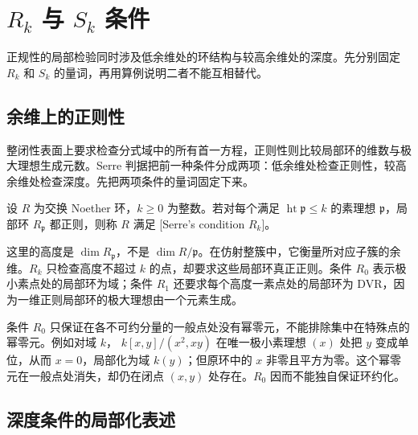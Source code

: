 
\section{\texorpdfstring{\(R_k\)}{Rₖ} 与 \texorpdfstring{\(S_k\)}{Sₖ} 条件}
\label{b3:sec:2001}

正规性的局部检验同时涉及低余维处的环结构与较高余维处的深度。先分别固定 \(R_k\) 和 \(S_k\) 的量词，再用算例说明二者不能互相替代。


%
%

\subsection{余维上的正则性}
\label{b3:subsec:2001:01}

整闭性表面上要求检查分式域中的所有首一方程，正则性则比较局部环的维数与极大理想生成元数。Serre 判据把前一种条件分成两项：低余维处检查正则性，较高余维处检查深度。先把两项条件的量词固定下来。

\begin{definition}\label{b3:def:serre-rk}
	设 \(R\) 为交换 Noether 环，\(k\ge0\) 为整数。若对每个满足 \(\operatorname{ht}\mathfrak p\le k\) 的素理想 \(\mathfrak p\)，局部环 \(R_{\mathfrak p}\) 都正则，则称 \(R\) 满足 [Serre's condition \(R_k\)]。
\end{definition}

这里的高度是 \(\dim R_{\mathfrak p}\)，不是 \(\dim R/\mathfrak p\)。在仿射整簇中，它衡量所对应子簇的余维。\(R_k\) 只检查高度不超过 \(k\) 的点，却要求这些局部环真正正则。条件 \(R_0\) 表示极小素点处的局部环为域；条件 \(R_1\) 还要求每个高度一素点处的局部环为 DVR，因为一维正则局部环的极大理想由一个元素生成。

\ProseParagraphBreak
条件 \(R_0\) 只保证在各不可约分量的一般点处没有幂零元，不能排除集中在特殊点的幂零元。例如对域 \(k\)， \(k[x,y]/(x^2,xy)\) 在唯一极小素理想 \((x)\) 处把 \(y\) 变成单位，从而 \(x=0\)，局部化为域 \(k(y)\)；但原环中的 \(x\) 非零且平方为零。这个幂零元在一般点处消失，却仍在闭点 \((x,y)\) 处存在。\(R_0\) 因而不能独自保证环约化。

\subsection{深度条件的局部化表述}
\label{b3:subsec:2001:02}

